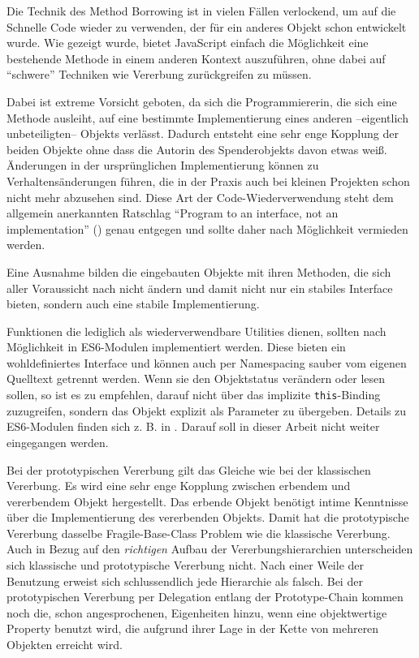 Die Technik des Method Borrowing ist in vielen Fällen verlockend, um auf die Schnelle Code wieder zu verwenden, der für ein anderes Objekt schon entwickelt wurde. Wie gezeigt wurde, bietet JavaScript einfach die Möglichkeit eine bestehende Methode in einem anderen Kontext auszuführen, ohne dabei auf "`schwere"' Techniken wie Vererbung zurückgreifen zu müssen. 

Dabei ist extreme Vorsicht geboten, da sich die Programmiererin, die sich eine Methode ausleiht, auf eine bestimmte Implementierung eines anderen --eigentlich un\-be\-tei\-lig\-ten-- Objekts verlässt. Dadurch entsteht eine sehr enge Kopplung der beiden Objekte ohne dass die Autorin des Spenderobjekts davon etwas weiß. Änderungen in der ursprünglichen Implementierung können zu Verhaltensänderungen führen, die in der Praxis auch bei kleinen Projekten schon nicht mehr abzusehen sind. Diese Art der Code-Wiederverwendung steht dem allgemein anerkannten Ratschlag "`Program to an interface, not an implementation"' (\citep[p. 18]{GoF}) genau entgegen und sollte daher nach Möglichkeit vermieden werden.

Eine Ausnahme bilden die eingebauten Objekte mit ihren Methoden, die sich aller Voraussicht nach nicht ändern und damit nicht nur ein stabiles Interface bieten, sondern auch eine stabile Implementierung. %

Funktionen die lediglich als wiederverwendbare Utilities dienen, sollten nach Möglichkeit in ES6-Modulen implementiert werden. Diese bieten ein wohldefiniertes Interface und können auch per Namespacing sauber vom eigenen Quelltext getrennt werden. Wenn sie den Objektstatus verändern oder lesen sollen, so ist es zu empfehlen, darauf nicht über das implizite \texttt{this}-Binding zuzugreifen, sondern das Objekt explizit als Parameter zu übergeben.
Details zu ES6-Modulen finden sich z. B. in \citep[§4]{ElliottProgrammingJavaScriptapplications2014}. Darauf soll in dieser Arbeit nicht weiter eingegangen werden.
%

\skippingparagraph

Bei der prototypischen Vererbung gilt das Gleiche wie bei der klassischen Vererbung. Es wird eine sehr enge Kopplung zwischen erbendem und vererbendem Objekt hergestellt. Das erbende Objekt benötigt intime Kenntnisse über die Implementierung des vererbenden Objekts. Damit hat die prototypische Vererbung dasselbe Fragile-Base-Class Problem wie die klassische Vererbung. Auch in Bezug auf den \emph{richtigen} Aufbau der Vererbungshierarchien unterscheiden sich klassische und prototypische Vererbung nicht. Nach einer Weile der Benutzung erweist sich schlussendlich jede Hierarchie als falsch. Bei der prototypischen Vererbung per Delegation entlang der Prototype-Chain kommen noch die, schon angesprochenen, Eigenheiten hinzu, wenn eine objektwertige Property benutzt wird, die aufgrund ihrer Lage in der Kette von mehreren Objekten erreicht wird.

